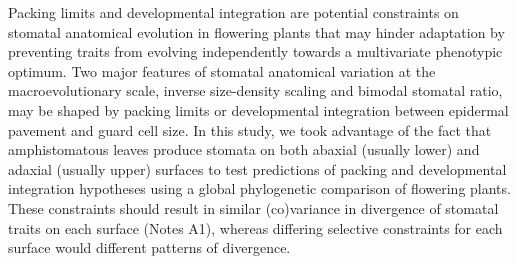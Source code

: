 \documentclass[
  12pt,
]{article}
\begin{document}
Packing limits and developmental integration are potential constraints on stomatal anatomical evolution in flowering plants that may hinder adaptation by preventing traits from evolving independently towards a multivariate phenotypic optimum. Two major features of stomatal anatomical variation at the macroevolutionary scale, inverse size-density scaling and bimodal stomatal ratio, may be shaped by packing limits or developmental integration between epidermal pavement and guard cell size. In this study, we took advantage of the fact that amphistomatous leaves produce stomata on both abaxial (usually lower) and adaxial (usually upper) surfaces to test predictions of packing and developmental integration hypotheses using a global phylogenetic comparison of flowering plants. These constraints should result in similar (co)variance in divergence of stomatal traits on each surface (Notes A1), whereas differing selective constraints for each surface would different patterns of divergence.
\end{document}
